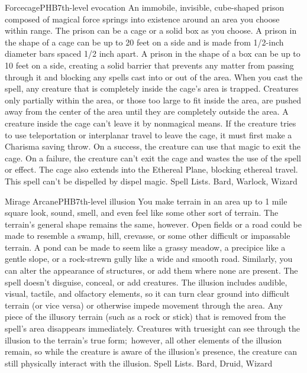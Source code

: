 \begin{spell}{Forcecage}{PHB}{7th-level evocation}
{
}
An immobile, invisible, cube-shaped prison composed of magical force springs into existence around an area you choose within range. The prison can be a cage or a solid box as you choose.
A prison in the shape of a cage can be up to 20 feet on a side and is made from 1/2-inch diameter bars spaced 1/2 inch apart.
A prison in the shape of a box can be up to 10 feet on a side, creating a solid barrier that prevents any matter from passing through it and blocking any spells cast into or out of the area.
When you cast the spell, any creature that is completely inside the cage's area is trapped. Creatures only partially within the area, or those too large to fit inside the area, are pushed away from the center of the area until they are completely outside the area.
A creature inside the cage can't leave it by nonmagical means. If the creature tries to use teleportation or interplanar travel to leave the cage, it must first make a Charisma saving throw. On a success, the creature can use that magic to exit the cage. On a failure, the creature can't exit the cage and wastes the use of the spell or effect. The cage also extends into the Ethereal Plane, blocking ethereal travel.
This spell can't be dispelled by dispel magic.
Spell Lists. Bard, Warlock, Wizard
\end{spell}

\begin{spell}{Mirage Arcane}{PHB}{7th-level illusion}
{
}
You make terrain in an area up to 1 mile square look, sound, smell, and even feel like some other sort of terrain. The terrain’s general shape remains the same, however. Open fields or a road could be made to resemble a swamp, hill, crevasse, or some other difficult or impassable terrain. A pond can be made to seem like a grassy meadow, a precipice like a gentle slope, or a rock-strewn gully like a wide and smooth road.
Similarly, you can alter the appearance of structures, or add them where none are present. The spell doesn’t disguise, conceal, or add creatures.
The illusion includes audible, visual, tactile, and olfactory elements, so it can turn clear ground into difficult terrain (or vice versa) or otherwise impede movement through the area. Any piece of the illusory terrain (such as a rock or stick) that is removed from the spell’s area disappears immediately.
Creatures with truesight can see through the illusion to the terrain’s true form; however, all other elements of the illusion remain, so while the creature is aware of the illusion’s presence, the creature can still physically interact with the illusion.
Spell Lists. Bard, Druid, Wizard
\end{spell}

